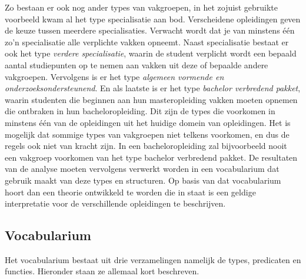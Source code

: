 Zo bestaan er ook nog ander types van vakgroepen, in het zojuist gebruikte voorbeeld kwam al het type specialisatie aan bod. Verscheidene opleidingen geven de keuze tussen meerdere specialisaties. Verwacht wordt dat je van minstens \'{e}\'{e}n zo'n specialisatie alle verplichte vakken opneemt. Naast specialisatie bestaat er ook het type \textit{verdere specialisatie}, waarin de student verplicht wordt een bepaald aantal studiepunten op te nemen aan vakken uit deze of bepaalde andere vakgroepen. Vervolgens is er het type \textit{algemeen vormende en onderzoeksondersteunend}. En als laatste is er het type \textit{bachelor verbredend pakket}, waarin studenten die beginnen aan hun masteropleiding vakken moeten opnemen die ontbraken in hun bacheloropleiding. Dit zijn de types die voorkomen in minstens \'{e}\'{e}n van de opleidingen uit het huidige domein van opleidingen. Het is mogelijk dat sommige types van vakgroepen niet telkens voorkomen, en dus de regels ook niet van kracht zijn. In een bacheloropleiding zal bijvoorbeeld nooit een vakgroep voorkomen van het type bachelor verbredend pakket. De resultaten van de analyse moeten vervolgens verwerkt worden in een vocabularium dat gebruik maakt van deze types en structuren. Op basis van dat vocabularium hoort dan een theorie ontwikkeld te worden die in staat is een geldige interpretatie voor de verschillende opleidingen te beschrijven. 

\subsection{Vocabularium}
Het vocabularium bestaat uit drie verzamelingen namelijk de types, predicaten en functies. Hieronder staan ze allemaal kort beschreven.

